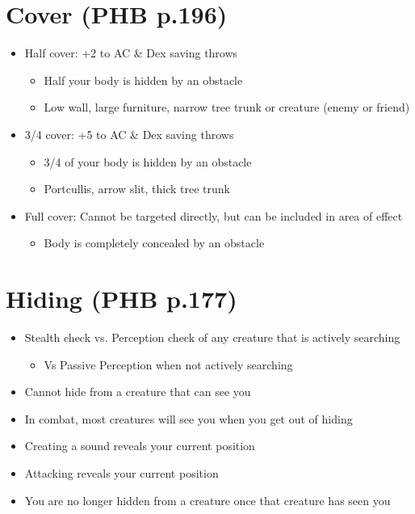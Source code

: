 \documentclass[a4paper]{article}
\begin{document}
\section{Cover \small (PHB p.196)}
\begin{itemize}
\item Half cover: +2 to AC \& Dex saving throws
	\begin{itemize}
	\item Half your body is hidden by an obstacle
	\item Low wall, large furniture, narrow tree trunk or creature (enemy or friend)
	\end{itemize}
\item 3/4 cover: +5 to AC \& Dex saving throws
	\begin{itemize}
	\item 3/4 of your body is hidden by an obstacle
	\item Portcullis, arrow slit, thick tree trunk
	\end{itemize}
\item Full cover: Cannot be targeted directly, but can be included in area of effect
	\begin{itemize}
	\item Body is completely concealed by an obstacle
	\end{itemize}
\end{itemize}
\section{Hiding \small (PHB p.177)}
\begin{itemize}
\item Stealth check vs. Perception check of any creature that is actively searching
	\begin{itemize}
	\item Vs Passive Perception when not actively searching
	\end{itemize}
\item Cannot hide from a creature that can see you
\item In combat, most creatures will see you when you get out of hiding
\item Creating a sound reveals your current position
\item Attacking reveals your current position
\item You are no longer hidden from a creature once that creature has seen you
\end{itemize}
\end{document}
